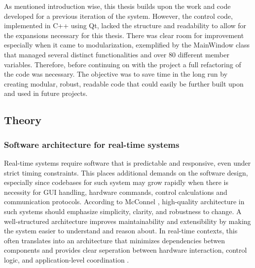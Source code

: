 As mentioned introduction wise, this thesis builds upon the work and code developed for a previous iteration of the system. However, the control code, implemented in C++ using Qt, lacked the structure and readability to allow for the expansions necessary for this thesis. There was clear room for improvement especially when it came to modularization, exemplified by the MainWindow class that managed several distinct functionalities and over 80 different member variables. Therefore, before continuing on with the project a full refactoring of the code was necessary. The objective was to save time in the long run by creating modular, robust, readable code that could easily be further built upon and used in future projects.

\subsection{Theory}
\subsubsection{Software architecture for real-time systems}
Real-time systems require software that is predictable and responsive, even under strict timing constraints. This places additional demands on the software design, especially since codebases for such system may grow rapidly when there is necessity for GUI handling, hardware commands, control calculations and communication protocols. According to McConnel \cite{steve_mcconnell_code_nodate}, high-quality architecture in such systems should emphasize simplicity, clarity, and robustness to change. 
\newline \newline
A well-structured architecture improves maintainability and extensibility by making the system easier to understand and reason about. In real-time contexts, this often translates into an architecture that minimizes dependencies betwen components and provides clear seperation between hardware interaction, control logic, and application-level coordination \cite{tanenbaum_distributed_2007}.


